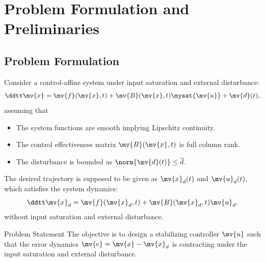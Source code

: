 \section{Problem Formulation and Preliminaries}

\subsection{Problem Formulation}

\begin{frame}{\insertsubsectionhead}{}
  
  Consider a control-affine system under input saturation and external disturbance:
  \begin{equation}
    \ddtt\mv{x} = \mv{f}(\mv{x},t) + \mv{B}(\mv{x},t) \mysat{\mv{u}} + \mv{d}(t)
    ,
  \end{equation}
  assuming that 
  \begin{itemize}
    \item The system functions are smooth implying Lipschitz continuity.
    \item The control effectiveness matrix $\mv{B}(\mv{x},t)$ is full column rank.
    \item The disturbance is bounded as $\norm{\mv{d}(t)} \le \overline{d}$.
  \end{itemize}

  \hfill

  {
  The desired trajectory is supposed to be given as $\mv{x}_d(t)$ and $\mv{u}_d(t)$, which satisfies the system dynamics:
  \begin{equation}
    \ddtt\mv{x}_d = \mv{f}(\mv{x}_d,t) + \mv{B}(\mv{x}_d,t) \mv{u}_d
    ,
  \end{equation}
  without input saturation and external disturbance.
  }

  {
  \begin{block}{Problem Statement}
    The objective is to design a stabilizing controller $\mv{u}$ such that the error dynamics $\mv{e} = \mv{x} - \mv{x}_d$ is contracting under the input saturation and external disturbance.
  \end{block}
  }

\end{frame}

